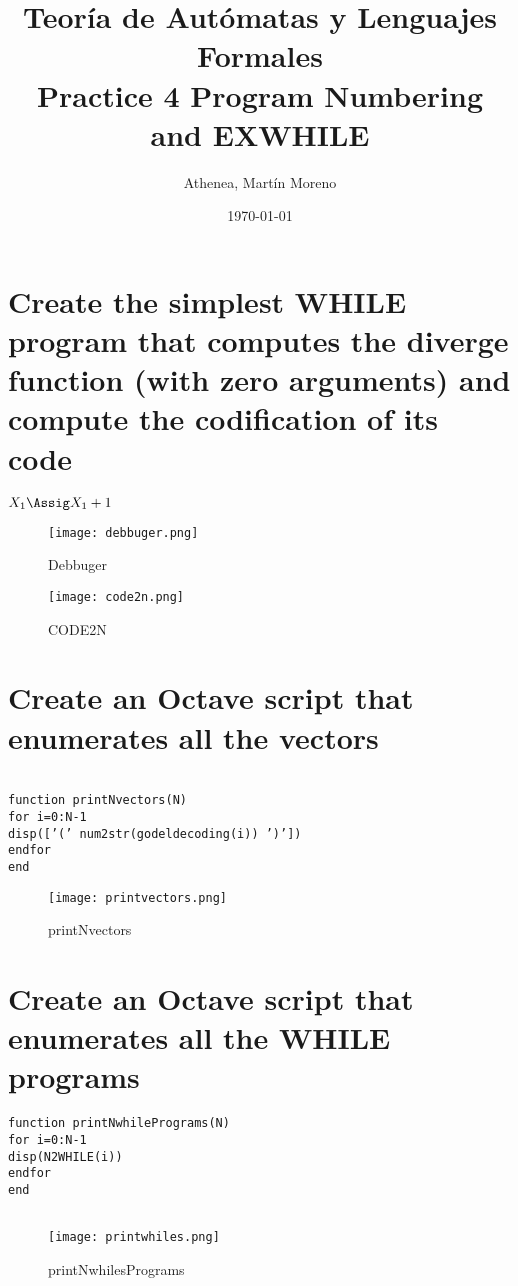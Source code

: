 \documentclass{article}
\title{Teoría de Autómatas y Lenguajes Formales\\[.4\baselineskip]Practice 4
Program Numbering and EXWHILE}
\author{Athenea, Martín Moreno}
\date{\today}
\theoremstyle{plain}
\theoremstyle{definition}
\begin{document}
\maketitle

\section{Create the simplest WHILE program that computes the diverge function (with zero arguments) and compute the codification of its code}

\begin{whilecode}[H]
$X_1\Assig X_1 + 1$\;
 \end{whilecode}
 
 \begin{figure}
    \centering
    \texttt{[image: debbuger.png]}
    \caption{Debbuger}
    \label{fig:my_label}
\end{figure}
 
  \begin{figure}
    \centering
    \texttt{[image: code2n.png]}
    \caption{CODE2N}
    \label{fig:my_label}
\end{figure}



\newpage
\section{Create an Octave script that enumerates all the vectors}



\begin{center}
\begin{verbatim}

function printNvectors(N)
for i=0:N-1
disp([’(’ num2str(godeldecoding(i)) ’)’])
endfor
end
\end{verbatim}
\end{center}
\begin{figure}
    \centering
    \texttt{[image: printvectors.png]}
    \caption{printNvectors}
    \label{fig:my_label}
\end{figure}


\newpage
\section{Create an Octave script that enumerates all the WHILE programs}

\begin{center}
\begin{verbatim}
function printNwhilePrograms(N)
for i=0:N-1
disp(N2WHILE(i))
endfor
end


\end{verbatim}
\end{center}

\begin{figure}
    \centering
    \texttt{[image: printwhiles.png]}
    \caption{printNwhilesPrograms}
    \label{fig:my_label}
\end{figure}
\end{document}
